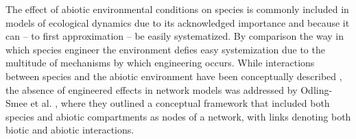\documentclass[twocolumn,preprintnumbers,amsmath,amssymb,superscriptaddress,linenumbers]{revtex4-1}
\begin{document}
\begin{bibunit}


% 




The effect of abiotic environmental conditions on species is commonly included in models of ecological dynamics \cite{Woodward2010,Brose2012,Gibert2019b} due to its acknowledged importance and because it can -- to first approximation -- be easily systematized. 
By comparison the way in which species engineer the environment defies easy systemization due to the multitude of mechanisms by which engineering occurs.
While interactions between species and the abiotic environment have been conceptually described \cite{Olff2009,Getz2011}, the absence of engineered effects in network models was addressed by Odling-Smee et al. \cite{OdlingSmee2013}, where they outlined a conceptual framework that included both species and abiotic compartments as nodes of a network, with links denoting both biotic and abiotic interactions.



\end{bibunit}
\end{document}
